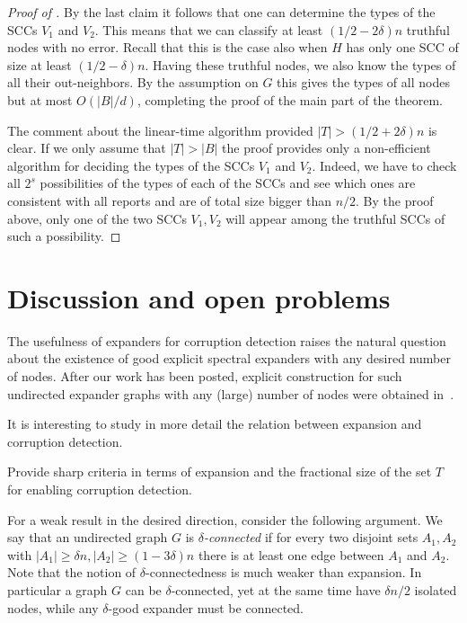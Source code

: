 \documentclass{toc}
\begin{document}
\begin{proof}[Proof of ]
By the last claim it follows that one can determine the types of
the SCCs $V_1$ and $V_2$. This means that we can classify
at least $(1/2-2 \delta)n$ truthful nodes with no error. Recall
that this is
the case also when $H$ has only one SCC of size
at least $(1/2-\delta)n$. Having these truthful nodes, we also
know the types of all their out-neighbors. By the assumption on $G$
this gives the types of all nodes but at most $O(|B|/d)$,
completing the proof of the main part of the theorem.  
\vspace{0.1cm}

\noindent
The comment about the
%
linear-time   %
algorithm provided $|T|>(1/2+2\delta)n$
is clear. If we only assume that $|T|>|B|$ the proof
provides only a non-efficient algorithm  for deciding the types of
the SCCs $V_1$ and $V_2$. Indeed, we have to check
all $2^s$ possibilities of the types of each of the SCCs and see
which ones are consistent with all reports and are of total size
bigger than $n/2$.
By the proof above, only one of the two SCCs $V_1,V_2$ will appear 
among the truthful SCCs of such a possibility.
%
\end{proof}   %

\section{Discussion and open problems}
\label{sec:open}

The usefulness of expanders for corruption detection raises 
the natural question about the existence of good explicit 
spectral expanders with any desired number of nodes. 
After our work has been posted, explicit construction for 
such undirected expander graphs with any (large) 
%
number of nodes were 
obtained in~\cite{A19}. 

It is interesting to study in more detail the relation
between expansion and corruption detection.

\begin{question}
Provide sharp criteria in terms of expansion and the fractional 
size of the set $T$ for enabling corruption detection.
\end{question} 

%
%
%
For a weak result in the desired direction,  %
consider the following argument.
We say that an undirected  graph $G$ is \emph{$\delta$-connected}
 if for every two disjoint sets
$A_1, A_2$ with $|A_1| \geq \delta n, | A_2 | \geq (1- 3 \delta) n$
there is at least one edge between $A_1$ and $A_2$. Note that the notion
of
%
$\delta$-connectedness   %
is much weaker than expansion.  In particular a graph
$G$ can be
%
$\delta$-connected,    %
yet at the same time have $\delta n/2 $
isolated nodes, while any $\delta$-good expander must be connected.
\end{document}
